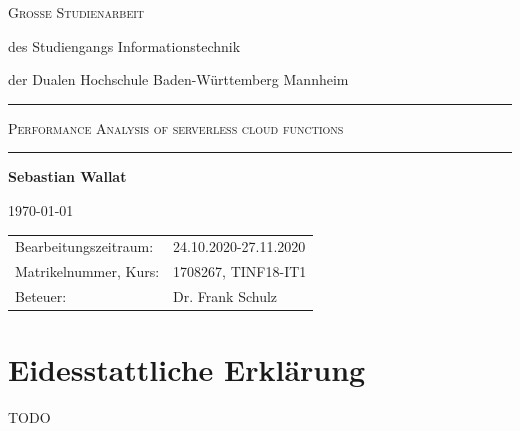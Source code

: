 \documentclass[12pt,a4paper,parskip=half]{scrreprt}
\begin{document}
\begin{titlepage}
{	}
	
	
	
	\bigskip
	
	
	
	\Large\textsc{Große Studienarbeit}
	
	
	
	\normalsize
	
	des Studiengangs Informationstechnik\par
	
	der Dualen Hochschule Baden-Württemberg Mannheim
	
	
	
	\rule{\textwidth}{.5mm}\bigskip
	
	
	
	\textsc{\large Performance Analysis of serverless cloud functions}	
	
	
	\rule{\textwidth}{.5mm}
	
	
	
	\vfill
	
	
	
	\par
	
	{\bfseries\large Sebastian Wallat}\par
	
	\today
	
	
	
	\vfill
	
	
	
	\small{%
		
		\begin{tabularx}{\textwidth}{@{}lX@{}}
			
			\toprule
			
			
			Bearbeitungszeitraum: & 24.10.2020-27.11.2020\\
			
			Matrikelnummer, Kurs: & 1708267, TINF18-IT1\\
			
			Beteuer: & Dr. Frank Schulz \\
			
		\end{tabularx}
		
	}
	
	\cleardoublepage
	
\end{titlepage}


\newpage
{}

\chapter*{Eidesstattliche Erklärung}
\vspace{50pt}
TODO
\\
\\
\end{document}
